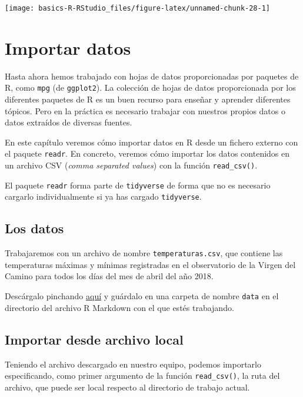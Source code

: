 \documentclass[
  degree=mecinf,
  title=normal,
  toc=normal,
  bib=normal]{mnye}
\begin{document}
\begin{center}\texttt{[image: basics-R-RStudio\_files/figure-latex/unnamed-chunk-28-1]} \end{center}

\hypertarget{import}{%
\section{Importar datos}\label{import}}

Hasta ahora hemos trabajado con hojas de datos proporcionadas por paquetes de \textsf{R}, como \texttt{mpg} (de \texttt{ggplot2}). La colección de hojas de datos proporcionada por los diferentes paquetes de \textsf{R} es un buen recurso para enseñar y aprender diferentes tópicos. Pero en la práctica es necesario trabajar con nuestros propios datos o datos extraídos de diversas fuentes.

En este capítulo veremos cómo importar datos en \textsf{R} desde un fichero externo con el paquete \texttt{readr}. En concreto, veremos cómo importar los datos contenidos en un archivo CSV (\emph{comma separated values}) con la función \texttt{read\_csv()}.

El paquete \texttt{readr} forma parte de \texttt{tidyverse} de forma que no es necesario cargarlo individualmente si ya has cargado \texttt{tidyverse}.

\hypertarget{los-datos}{%
\subsection{Los datos}\label{los-datos}}

Trabajaremos con un archivo de nombre \texttt{temperaturas.csv}, que contiene las temperaturas máximas y mínimas registradas en el observatorio de la Virgen del Camino para todos los días del mes de abril del año 2018.

Descárgalo pinchando \href{https://drive.google.com/uc?export=download\&id=1xDIvAcQSS4_dFoSIO2hcprhqnbXJqx9r}{aquí} y guárdalo en una carpeta de nombre \texttt{data} en el directorio del archivo R Markdown con el que estés trabajando.

\hypertarget{importar-desde-archivo-local}{%
\subsection{Importar desde archivo local}\label{importar-desde-archivo-local}}

Teniendo el archivo descargado en nuestro equipo, podemos importarlo especificando, como primer argumento de la función \texttt{read\_csv()}, la ruta del archivo, que puede ser local respecto al directorio de trabajo actual.
\end{document}
